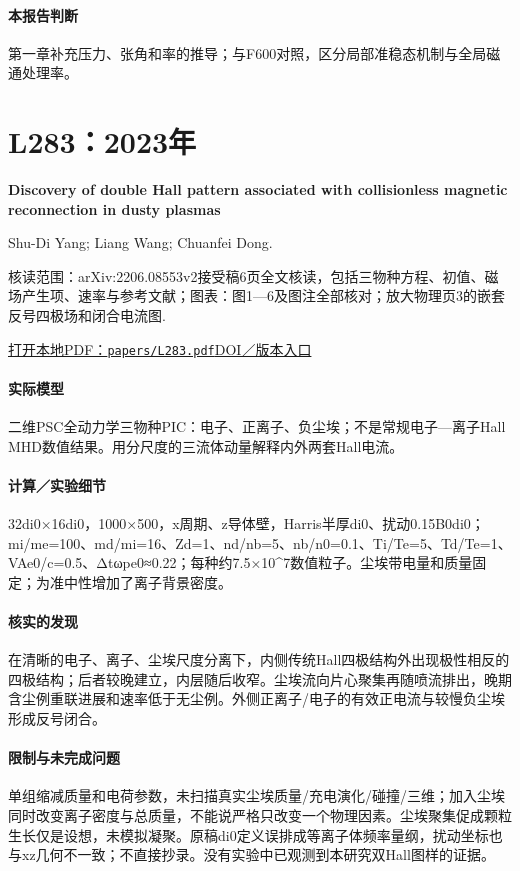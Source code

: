 \paragraph{本报告判断}第一章补充压力、张角和率的推导；与F600对照，区分局部准稳态机制与全局磁通处理率。

\section{L283：2023年}\label{paper:L283}

\textbf{Discovery of double Hall pattern associated with collisionless magnetic reconnection in dusty plasmas}\citep{L283}\

Shu-Di Yang;  Liang Wang;  Chuanfei Dong.

\textsf{核读范围：}arXiv:2206.08553v2接受稿6页全文核读，包括三物种方程、初值、磁场产生项、速率与参考文献；\textsf{图表：}图1—6及图注全部核对；放大物理页3的嵌套反号四极场和闭合电流图.

\href{run:papers/L283.pdf}{打开本地PDF：\texttt{papers/L283.pdf}}\quad\href{https://doi.org/10.1093/mnras/stad1453}{DOI／版本入口}

\paragraph{实际模型}二维PSC全动力学三物种PIC：电子、正离子、负尘埃；不是常规电子—离子Hall MHD数值结果。用分尺度的三流体动量解释内外两套Hall电流。

\paragraph{计算／实验细节}32di0×16di0，1000×500，x周期、z导体壁，Harris半厚di0、扰动0.15B0di0；mi/me=100、md/mi=16、Zd=1、nd/nb=5、nb/n0=0.1、Ti/Te=5、Td/Te=1、VAe0/c=0.5、Δtωpe0≈0.22；每种约7.5×10\textasciicircum{}7数值粒子。尘埃带电量和质量固定；为准中性增加了离子背景密度。

\paragraph{核实的发现}在清晰的电子、离子、尘埃尺度分离下，内侧传统Hall四极结构外出现极性相反的四极结构；后者较晚建立，内层随后收窄。尘埃流向片心聚集再随喷流排出，晚期含尘例重联进展和速率低于无尘例。外侧正离子/电子的有效正电流与较慢负尘埃形成反号闭合。

\paragraph{限制与未完成问题}单组缩减质量和电荷参数，未扫描真实尘埃质量/充电演化/碰撞/三维；加入尘埃同时改变离子密度与总质量，不能说严格只改变一个物理因素。尘埃聚集促成颗粒生长仅是设想，未模拟凝聚。原稿di0定义误排成等离子体频率量纲，扰动坐标也与xz几何不一致；不直接抄录。没有实验中已观测到本研究双Hall图样的证据。

